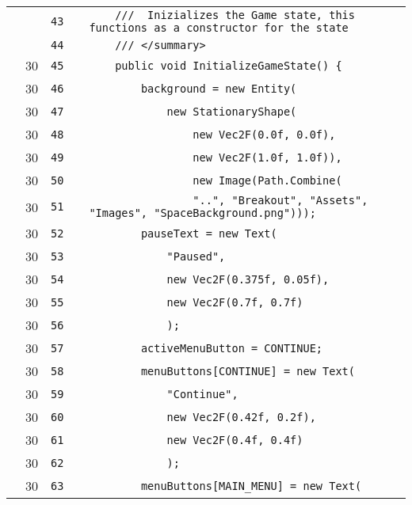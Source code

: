 \documentclass[a4paper,landscape,10pt]{article}
\begin{document}
\begin{longtable}[l]{lrrll}
\cellcolor{gray} &  & \verb~43~ & & \verb~    ///  Inizializes the Game state, this functions as a constructor for the state~\\
\cellcolor{gray} &  & \verb~44~ & & \verb~    /// </summary>~\\
\cellcolor{green} & 30 & \verb~45~ & & \verb~    public void InitializeGameState() {~\\
\cellcolor{green} & 30 & \verb~46~ & & \verb~        background = new Entity(~\\
\cellcolor{green} & 30 & \verb~47~ & & \verb~            new StationaryShape(~\\
\cellcolor{green} & 30 & \verb~48~ & & \verb~                new Vec2F(0.0f, 0.0f),~\\
\cellcolor{green} & 30 & \verb~49~ & & \verb~                new Vec2F(1.0f, 1.0f)),~\\
\cellcolor{green} & 30 & \verb~50~ & & \verb~                new Image(Path.Combine(~\\
\cellcolor{green} & 30 & \verb~51~ & & \verb~                "..", "Breakout", "Assets", "Images", "SpaceBackground.png")));~\\
\cellcolor{green} & 30 & \verb~52~ & & \verb~        pauseText = new Text(~\\
\cellcolor{green} & 30 & \verb~53~ & & \verb~            "Paused",~\\
\cellcolor{green} & 30 & \verb~54~ & & \verb~            new Vec2F(0.375f, 0.05f),~\\
\cellcolor{green} & 30 & \verb~55~ & & \verb~            new Vec2F(0.7f, 0.7f)~\\
\cellcolor{green} & 30 & \verb~56~ & & \verb~            );~\\
\cellcolor{green} & 30 & \verb~57~ & & \verb~        activeMenuButton = CONTINUE;~\\
\cellcolor{green} & 30 & \verb~58~ & & \verb~        menuButtons[CONTINUE] = new Text(~\\
\cellcolor{green} & 30 & \verb~59~ & & \verb~            "Continue",~\\
\cellcolor{green} & 30 & \verb~60~ & & \verb~            new Vec2F(0.42f, 0.2f),~\\
\cellcolor{green} & 30 & \verb~61~ & & \verb~            new Vec2F(0.4f, 0.4f)~\\
\cellcolor{green} & 30 & \verb~62~ & & \verb~            );~\\
\cellcolor{green} & 30 & \verb~63~ & & \verb~        menuButtons[MAIN_MENU] = new Text(~\\

\end{longtable}
\end{document}
